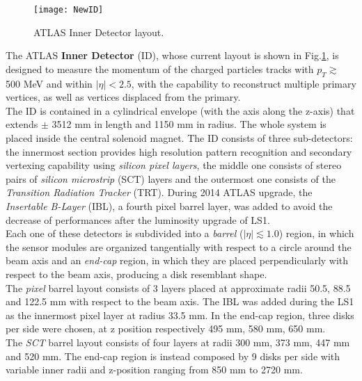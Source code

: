\documentclass[a4paper,twoside,12pt]{book}
\begin{document}
\begin{figure} [h]
\centering
	\texttt{[image: NewID]}
	\caption{ATLAS Inner Detector layout\cite{Aad:2008zzm}.}
	\label{fig:IDLayout}
\end{figure}

The ATLAS \textbf{Inner Detector} (ID), whose current layout is shown in \mbox{Fig.\ref{fig:IDLayout}}, is designed to measure the momentum of the
charged particles tracks with $p_{T} \gtrsim$ 500 MeV and 
within $|\eta| < 2.5$, with the capability to reconstruct multiple primary vertices, as well as vertices displaced from the primary\cite{Aad:2008zzm}. \\

The ID is contained in a cylindrical envelope (with the axis along the z-axis) that extends
$\pm$ 3512 mm in length and 1150 mm in radius. The whole system is placed inside
the central solenoid magnet. The ID consists of three sub-detectors: the innermost section provides
high resolution pattern recognition and secondary vertexing capability using \textit{silicon pixel layers}, the middle one consists of stereo pairs of \textit{silicon microstrip} (SCT) layers and the outermost one consists of the \textit{Transition Radiation Tracker} (TRT). During 2014 ATLAS upgrade, the \textit{Insertable B-Layer} (IBL), a fourth pixel barrel layer, was added to avoid the decrease of performances after the luminosity upgrade of LS1. \\

Each one of these detectors is subdivided into a \textit{barrel} ($|\eta| \lesssim 1.0$) region, in which the sensor modules 
are organized tangentially with respect to a circle around the beam axis and an \textit{end-cap} region, in which they are placed perpendicularly with respect to the beam axis, producing
a disk resemblant shape.\\

The \textit{pixel} barrel layout consists of 3 layers placed at approximate radii 50.5, 88.5 and 122.5 mm with respect to the beam 
axis. The IBL was added during the LS1 as the
innermost pixel layer at radius 33.5 mm. In the end-cap region, three disks per side were chosen,
at z position respectively 495 mm, 580 mm, 650 mm. \\

The \textit{SCT} barrel layout consists of four layers at radii 300 mm, 373 mm, 447 mm and 520 mm. The end-cap region is instead composed by 9 disks per side with variable
inner radii and z-position ranging from 850 mm to 2720 mm. \\
\end{document}
